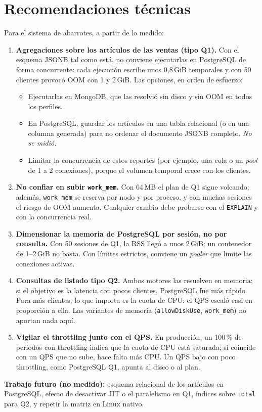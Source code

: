 \documentclass[11pt,a4paper]{article}
\newcommand{\cod}[1]{\texttt{#1}}
\begin{document}
\section{Recomendaciones técnicas}
Para el sistema de abarrotes, a partir de lo medido:
\begin{enumerate}
\item \textbf{Agregaciones sobre los artículos de las ventas (tipo Q1).} Con el esquema
  JSONB tal como está, no conviene ejecutarlas en PostgreSQL de forma concurrente: cada
  ejecución escribe unos 0,8\,GiB temporales y con 50 clientes provocó OOM con 1 y 2\,GiB.
  Las opciones, en orden de esfuerzo:
  \begin{itemize}
  \item Ejecutarlas en MongoDB, que las resolvió sin disco y sin OOM en todos los perfiles.
  \item En PostgreSQL, guardar los artículos en una tabla relacional (o en una columna
    generada) para no ordenar el documento JSONB completo. \emph{No se midió.}
  \item Limitar la concurrencia de estos reportes (por ejemplo, una cola o un
    \textit{pool} de 1 a 2 conexiones), porque el volumen temporal crece con los clientes.
  \end{itemize}
\item \textbf{No confiar en subir \cod{work\_mem}.} Con 64\,MB el plan de Q1 sigue
  volcando; además, \cod{work\_mem} se reserva por nodo y por proceso, y con muchas
  sesiones el riesgo de OOM aumenta. Cualquier cambio debe probarse con el
  \cod{EXPLAIN} y con la concurrencia real.
\item \textbf{Dimensionar la memoria de PostgreSQL por sesión, no por consulta.} Con 50
  sesiones de Q1, la RSS llegó a unos 2\,GiB; un contenedor de 1--2\,GiB no basta. Con
  límites estrictos, conviene un \textit{pooler} que limite las conexiones activas.
\item \textbf{Consultas de listado tipo Q2.} Ambos motores las resuelven en memoria; si el
  objetivo es la latencia con pocos clientes, PostgreSQL fue más rápido. Para más
  clientes, lo que importa es la cuota de CPU: el QPS escaló casi en proporción a ella.
  Las variantes de memoria (\cod{allowDiskUse}, \cod{work\_mem}) no aportan nada aquí.
\item \textbf{Vigilar el throttling junto con el QPS.} En producción, un 100\,\% de
  periodos con throttling indica que la cuota de CPU está saturada; si coincide con un QPS
  que no sube, hace falta más CPU. Un QPS bajo con poco throttling, como PostgreSQL Q1,
  apunta al disco o al plan.
\end{enumerate}
\textbf{Trabajo futuro (no medido):} esquema relacional de los artículos en PostgreSQL,
efecto de desactivar JIT o el paralelismo en Q1, índices sobre \cod{total} para Q2, y
repetir la matriz en Linux nativo.
\end{document}
